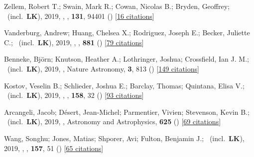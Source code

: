 \item[{\color{numcolor}\scriptsize31}] Zellem, Robert T.; Swain, Mark R.; Cowan, Nicolas B.; Bryden, Geoffrey; \etal\ (incl.\ \textbf{LK}), 2019, , \pasp, \textbf{131}, 94401 () [\href{https://ui.adsabs.harvard.edu/abs/2019PASP..131i4401Z}{16 citations}]

\item[{\color{numcolor}\scriptsize30}] Vanderburg, Andrew; Huang, Chelsea X.; Rodriguez, Joseph E.; Becker, Juliette C.; \etal\ (incl.\ \textbf{LK}), 2019, , \apj, \textbf{881} () [\href{https://ui.adsabs.harvard.edu/abs/2019ApJ...881L..19V}{79 citations}]

\item[{\color{numcolor}\scriptsize29}] Benneke, Bj{\"o}rn; Knutson, Heather A.; Lothringer, Joshua; Crossfield, Ian J. M.; \etal\ (incl.\ \textbf{LK}), 2019, , Nature Astronomy, \textbf{3}, 813 () [\href{https://ui.adsabs.harvard.edu/abs/2019NatAs...3..813B}{149 citations}]

\item[{\color{numcolor}\scriptsize28}] Kostov, Veselin B.; Schlieder, Joshua E.; Barclay, Thomas; Quintana, Elisa V.; \etal\ (incl.\ \textbf{LK}), 2019, , \aj, \textbf{158}, 32 () [\href{https://ui.adsabs.harvard.edu/abs/2019AJ....158...32K}{93 citations}]

\item[{\color{numcolor}\scriptsize27}] Arcangeli, Jacob; D{\'e}sert, Jean-Michel; Parmentier, Vivien; Stevenson, Kevin B.; \etal\ (incl.\ \textbf{LK}), 2019, , Astronomy and Astrophysics, \textbf{625} () [\href{https://ui.adsabs.harvard.edu/abs/2019A&A...625A.136A}{69 citations}]

\item[{\color{numcolor}\scriptsize26}] Wang, Songhu; Jones, Matias; Shporer, Avi; Fulton, Benjamin J.; \etal\ (incl.\ \textbf{LK}), 2019, , \aj, \textbf{157}, 51 () [\href{https://ui.adsabs.harvard.edu/abs/2019AJ....157...51W}{65 citations}]

